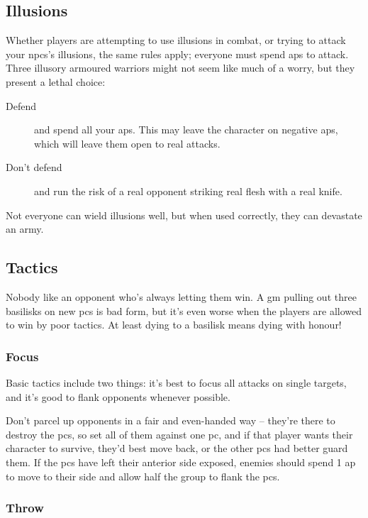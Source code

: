 \begin{multicols}{2}
\subsection{Illusions}

Whether players are attempting to use illusions in combat, or trying to attack your \glspl{npc}'s illusions, the same rules apply; everyone must spend \glspl{ap} to attack.
Three illusory armoured warriors might not seem like much of a worry, but they present a lethal choice:

\begin{description}
  \item[Defend]
  and spend all your \glspl{ap}.
  This may leave the character on negative \glspl{ap}, which will leave them open to real attacks.
  \item[Don't defend]
  and run the risk of a real opponent striking real flesh with a real knife. 
\end{description}

Not everyone can wield illusions well, but when used correctly, they can devastate an army.

\subsection{Tactics}

Nobody like an opponent who's always letting them win.
A \gls{gm} pulling out three basilisks on new \glspl{pc} is bad form, but it's even worse when the players are allowed to win by poor tactics.
At least dying to a basilisk means dying with honour!

\subsubsection{Focus}

Basic tactics include two things: it's best to focus all attacks on single targets, and it's good to flank opponents whenever possible.

Don't parcel up opponents in a fair and even-handed way -- they're there to destroy the \glspl{pc}, so set all of them against one \gls{pc}, and if that player wants their character to survive, they'd best move back, or the other \glspl{pc} had better guard them.%
If the \glspl{pc} have left their anterior side exposed, enemies should spend 1 \gls{ap} to move to their side and allow half the group to flank the \glspl{pc}.

\subsubsection{Throw}


\end{multicols}
